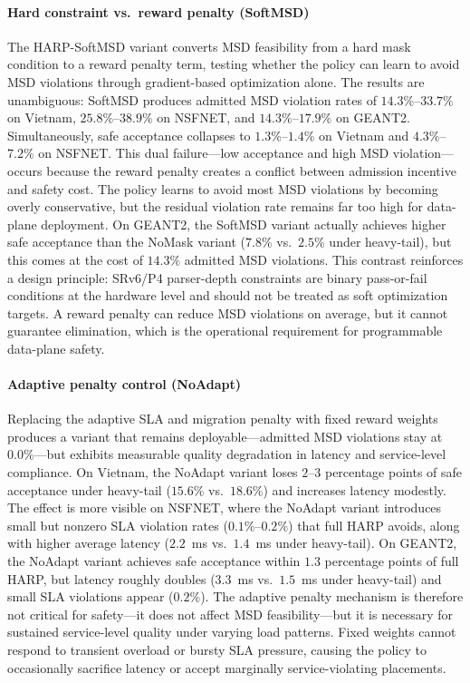 \documentclass[final,5p]{elsarticle}
\begin{document}
\paragraph{Hard constraint vs.\ reward penalty (SoftMSD)}
The HARP-SoftMSD variant converts MSD feasibility from a hard mask condition to a reward penalty term, testing whether the policy can learn to avoid MSD violations through gradient-based optimization alone. The results are unambiguous: SoftMSD produces admitted MSD violation rates of \(14.3\%\)--\(33.7\%\) on Vietnam, \(25.8\%\)--\(38.9\%\) on NSFNET, and \(14.3\%\)--\(17.9\%\) on GEANT2. Simultaneously, safe acceptance collapses to \(1.3\%\)--\(1.4\%\) on Vietnam and \(4.3\%\)--\(7.2\%\) on NSFNET. This dual failure---low acceptance and high MSD violation---occurs because the reward penalty creates a conflict between admission incentive and safety cost. The policy learns to avoid most MSD violations by becoming overly conservative, but the residual violation rate remains far too high for data-plane deployment. On GEANT2, the SoftMSD variant actually achieves higher safe acceptance than the NoMask variant (\(7.8\%\) vs.\ \(2.5\%\) under heavy-tail), but this comes at the cost of \(14.3\%\) admitted MSD violations. This contrast reinforces a design principle: SRv6/P4 parser-depth constraints are binary pass-or-fail conditions at the hardware level and should not be treated as soft optimization targets. A reward penalty can reduce MSD violations on average, but it cannot guarantee elimination, which is the operational requirement for programmable data-plane safety.

\paragraph{Adaptive penalty control (NoAdapt)}
Replacing the adaptive SLA and migration penalty with fixed reward weights produces a variant that remains deployable---admitted MSD violations stay at \(0.0\%\)---but exhibits measurable quality degradation in latency and service-level compliance. On Vietnam, the NoAdapt variant loses \(2\)--\(3\) percentage points of safe acceptance under heavy-tail (\(15.6\%\) vs.\ \(18.6\%\)) and increases latency modestly. The effect is more visible on NSFNET, where the NoAdapt variant introduces small but nonzero SLA violation rates (\(0.1\%\)--\(0.2\%\)) that full HARP avoids, along with higher average latency (\(2.2\)~ms vs.\ \(1.4\)~ms under heavy-tail). On GEANT2, the NoAdapt variant achieves safe acceptance within \(1.3\) percentage points of full HARP, but latency roughly doubles (\(3.3\)~ms vs.\ \(1.5\)~ms under heavy-tail) and small SLA violations appear (\(0.2\%\)). The adaptive penalty mechanism is therefore not critical for safety---it does not affect MSD feasibility---but it is necessary for sustained service-level quality under varying load patterns. Fixed weights cannot respond to transient overload or bursty SLA pressure, causing the policy to occasionally sacrifice latency or accept marginally service-violating placements.
\end{document}
